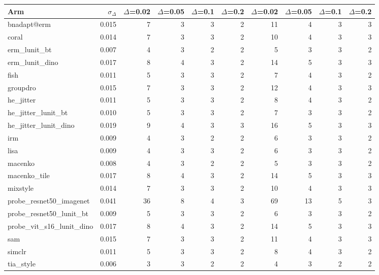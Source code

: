 \begin{tabular}{lrrrrrrrrr}
\toprule
Arm & $\sigma_\Delta$ & $\Delta$=0.02 & $\Delta$=0.05 & $\Delta$=0.1 & $\Delta$=0.2 & $\Delta$=0.02 & $\Delta$=0.05 & $\Delta$=0.1 & $\Delta$=0.2 \\
\midrule
bnadapt@erm & 0.015 & 7 & 3 & 3 & 2 & 11 & 4 & 3 & 3 \\
coral & 0.014 & 7 & 3 & 3 & 2 & 10 & 4 & 3 & 3 \\
erm\_lunit\_bt & 0.007 & 4 & 3 & 2 & 2 & 5 & 3 & 3 & 2 \\
erm\_lunit\_dino & 0.017 & 8 & 4 & 3 & 2 & 14 & 5 & 3 & 3 \\
fish & 0.011 & 5 & 3 & 3 & 2 & 7 & 4 & 3 & 2 \\
groupdro & 0.015 & 7 & 3 & 3 & 2 & 12 & 4 & 3 & 3 \\
he\_jitter & 0.011 & 5 & 3 & 3 & 2 & 8 & 4 & 3 & 2 \\
he\_jitter\_lunit\_bt & 0.010 & 5 & 3 & 3 & 2 & 7 & 3 & 3 & 2 \\
he\_jitter\_lunit\_dino & 0.019 & 9 & 4 & 3 & 3 & 16 & 5 & 3 & 3 \\
irm & 0.009 & 4 & 3 & 2 & 2 & 6 & 3 & 3 & 2 \\
lisa & 0.009 & 4 & 3 & 3 & 2 & 6 & 3 & 3 & 2 \\
macenko & 0.008 & 4 & 3 & 2 & 2 & 5 & 3 & 3 & 2 \\
macenko\_tile & 0.017 & 8 & 4 & 3 & 2 & 14 & 5 & 3 & 3 \\
mixstyle & 0.014 & 7 & 3 & 3 & 2 & 10 & 4 & 3 & 3 \\
probe\_resnet50\_imagenet & 0.041 & 36 & 8 & 4 & 3 & 69 & 13 & 5 & 3 \\
probe\_resnet50\_lunit\_bt & 0.009 & 5 & 3 & 3 & 2 & 6 & 3 & 3 & 2 \\
probe\_vit\_s16\_lunit\_dino & 0.017 & 8 & 4 & 3 & 2 & 14 & 5 & 3 & 3 \\
sam & 0.015 & 7 & 3 & 3 & 2 & 11 & 4 & 3 & 3 \\
simclr & 0.011 & 5 & 3 & 3 & 2 & 8 & 4 & 3 & 2 \\
tia\_style & 0.006 & 3 & 3 & 2 & 2 & 4 & 3 & 2 & 2 \\
\bottomrule
\end{tabular}
